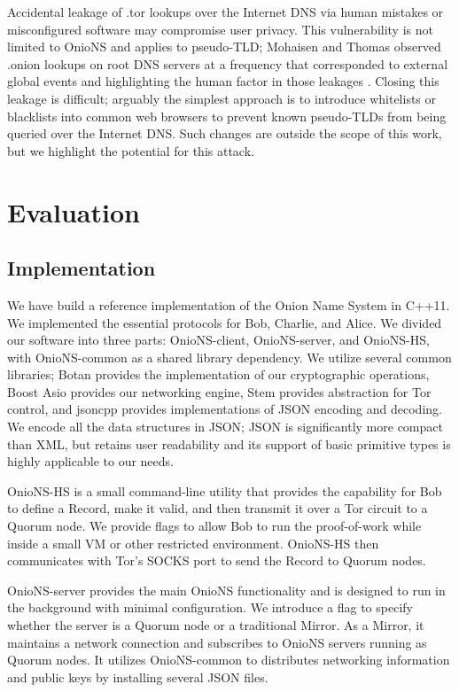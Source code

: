 \documentclass[USenglish,oneside,twocolumn]{article}
\begin{document}
Accidental leakage of .tor lookups over the Internet DNS via human mistakes or misconfigured software may compromise user privacy. This vulnerability is not limited to OnioNS and applies to pseudo-TLD; Mohaisen and Thomas observed .onion lookups on root DNS servers at a frequency that corresponded to external global events and highlighting the human factor in those leakages \cite{thomasmeasuring}. Closing this leakage is difficult; arguably the simplest approach is to introduce whitelists or blacklists into common web browsers to prevent known pseudo-TLDs from being queried over the Internet DNS. Such changes are outside the scope of this work, but we highlight the potential for this attack.

\section{Evaluation}
\label{sec:Evaluation}

\subsection{Implementation}

We have build a reference implementation of the Onion Name System in C++11. We implemented the essential protocols for Bob, Charlie, and Alice. We divided our software into three parts: OnioNS-client, OnioNS-server, and OnioNS-HS, with OnioNS-common as a shared library dependency. We utilize several common libraries; Botan \cite{BotanLib} provides the implementation of our cryptographic operations, Boost Asio \cite{AsioLib} provides our networking engine, Stem provides abstraction for Tor control, and jsoncpp \cite{JsonCppLib} provides implementations of JSON encoding and decoding. We encode all the data structures in JSON; JSON is significantly more compact than XML, but retains user readability and its support of basic primitive types is highly applicable to our needs. 

OnioNS-HS is a small command-line utility that provides the capability for Bob to define a Record, make it valid, and then transmit it over a Tor circuit to a Quorum node. We provide flags to allow Bob to run the proof-of-work while inside a small VM or other restricted environment. OnioNS-HS then communicates with Tor's SOCKS port to send the Record to Quorum nodes.

OnioNS-server provides the main OnioNS functionality and is designed to run in the background with minimal configuration. We introduce a flag to specify whether the server is a Quorum node or a traditional Mirror. As a Mirror, it maintains a network connection and subscribes to OnioNS servers running as Quorum nodes. It utilizes OnioNS-common to distributes networking information and public keys by installing several JSON files.
\end{document}
